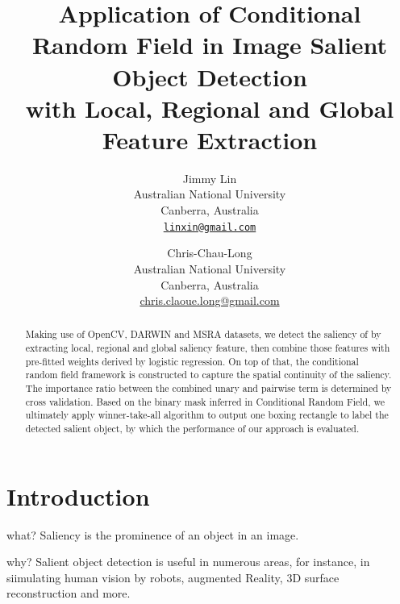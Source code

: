 \documentclass[10pt,twocolumn,letterpaper]{article}
\begin{document}
\title{Application of Conditional Random Field in Image Salient Object Detection\\ with Local, Regional and Global Feature Extraction}

\author{Jimmy Lin\\
Australian National University\\
Canberra, Australia\\
{\tt\small \url{linxin@gmail.com}}
\and
Chris-Chau-Long\\
Australian National University\\
Canberra, Australia\\
{\small\url{chris.claoue.long@gmail.com}}
}

\maketitle

\begin{abstract}
    Making use of OpenCV, DARWIN and MSRA datasets, we detect the saliency of by extracting local, 
    regional and global saliency feature, 
    then combine those features with pre-fitted weights derived by logistic regression.
    On top of that, the conditional random field framework is constructed to capture the spatial continuity of the saliency.
    The importance ratio between the combined unary and pairwise term is determined by cross validation.
    Based on the binary mask inferred in Conditional Random Field, we ultimately apply winner-take-all algorithm to 
    output one boxing rectangle to label the detected salient object, by which the performance of our 
    approach is evaluated. 
\end{abstract}

\section{Introduction}
what? Saliency is the prominence of an object in an image.

why? Salient object detection is useful in numerous areas, for instance, in siimulating human vision by robots, augmented Reality, 3D surface reconstruction and more.
\end{document}
